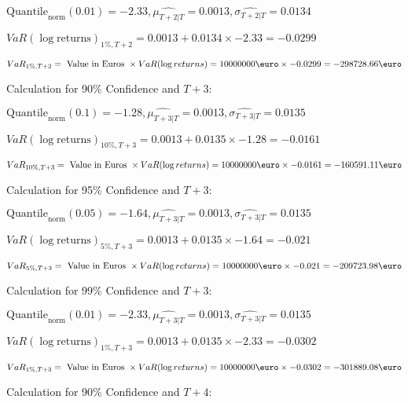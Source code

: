 \indent\indent $\text{Quantile}_\text{norm}(0.01) = -2.33,\hat{\mu_{T+2|T}} = 0.0013, \hat{\sigma_{T+2|T}} = 0.0134$

\indent\indent $VaR(\log \text{returns})_{1\%, T + 2} = 0.0013 + 0.0134\times-2.33 = -0.0299$

\indent\indent $VaR_{1\%, T + 2} = \text{ Value in Euros } \times VaR(\log returns) = 10 000 000 \text{\euro} \times-0.0299 = -298728.66 \text{\euro}$\newline




Calculation for 90\% Confidence and $T+3$:

\indent\indent $\text{Quantile}_\text{norm}(0.1) = -1.28,\hat{\mu_{T+3|T}} = 0.0013, \hat{\sigma_{T+3|T}} = 0.0135$

\indent\indent $VaR(\log \text{returns})_{10\%, T + 3} = 0.0013 + 0.0135\times-1.28 = -0.0161$

\indent\indent $VaR_{10\%, T + 3} = \text{ Value in Euros } \times VaR(\log returns) = 10 000 000 \text{\euro} \times-0.0161 = -160591.11 \text{\euro}$\newline




Calculation for 95\% Confidence and $T+3$:

\indent\indent $\text{Quantile}_\text{norm}(0.05) = -1.64,\hat{\mu_{T+3|T}} = 0.0013, \hat{\sigma_{T+3|T}} = 0.0135$

\indent\indent $VaR(\log \text{returns})_{5\%, T + 3} = 0.0013 + 0.0135\times-1.64 = -0.021$

\indent\indent $VaR_{5\%, T + 3} = \text{ Value in Euros } \times VaR(\log returns) = 10 000 000 \text{\euro} \times-0.021 = -209723.98 \text{\euro}$\newline




Calculation for 99\% Confidence and $T+3$:

\indent\indent $\text{Quantile}_\text{norm}(0.01) = -2.33,\hat{\mu_{T+3|T}} = 0.0013, \hat{\sigma_{T+3|T}} = 0.0135$

\indent\indent $VaR(\log \text{returns})_{1\%, T + 3} = 0.0013 + 0.0135\times-2.33 = -0.0302$

\indent\indent $VaR_{1\%, T + 3} = \text{ Value in Euros } \times VaR(\log returns) = 10 000 000 \text{\euro} \times-0.0302 = -301889.08 \text{\euro}$\newline




Calculation for 90\% Confidence and $T+4$:

